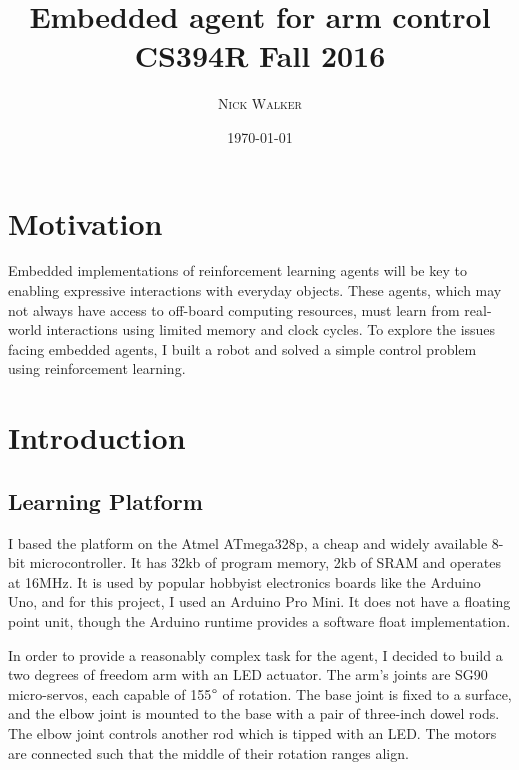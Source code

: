 \documentclass{article}
\title{Embedded agent for arm control \\ \large CS394R Fall 2016} %
\author{\textsc{Nick Walker}} %
\date{\today} %
\begin{document}
	
	\maketitle %
	
	
	
	\section{Motivation}
	
	Embedded implementations of reinforcement learning agents will be key to enabling expressive interactions with everyday objects. These agents, which may not always have access to off-board computing resources, must learn from real-world interactions using limited memory and clock cycles. To explore the issues facing embedded agents, I built a robot and solved a simple control problem using reinforcement learning.
	
	
	
	\section{Introduction}
	
	\subsection{Learning Platform}
	
	I based the platform on the Atmel ATmega328p, a cheap and widely available 8-bit microcontroller. It has 32kb of program memory, 2kb of SRAM and operates at 16MHz. It is used by popular hobbyist electronics boards like the Arduino Uno, and for this project, I used an Arduino Pro Mini. It does not have a floating point unit, though the Arduino runtime provides a software float implementation.
	
	In order to provide a reasonably complex task for the agent, I decided to build a two degrees of freedom arm with an LED actuator. The arm's joints are SG90 micro-servos, each capable of 155$\degree$ of rotation. The base joint is fixed to a surface, and the elbow joint is mounted to the base with a pair of three-inch dowel rods. The elbow joint controls another rod which is tipped with an LED. The motors are connected such that the middle of their rotation ranges align.
	
\end{document}
